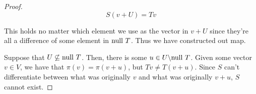 \begin{enumerate}
\begin{proof}
        $$S(v + U) = Tv$$

        This holds no matter which element we use as the vector in $v + U$ since they're all a difference of some element in $\text{null } T$. Thus we have constructed out map.

        Suppose that $U \not \subseteq \text{null } T$. Then, there is some $u \in U \backslash \text{null } T$. Given some vector $v \in V$, we have that $\pi(v) = \pi(v + u)$, but $Tv \neq T(v + u)$. Since $S$ can't differentiate between what was originally $v$ and what was originally $v + u$, $S$ cannot exist.
    \end{proof}
\end{enumerate}